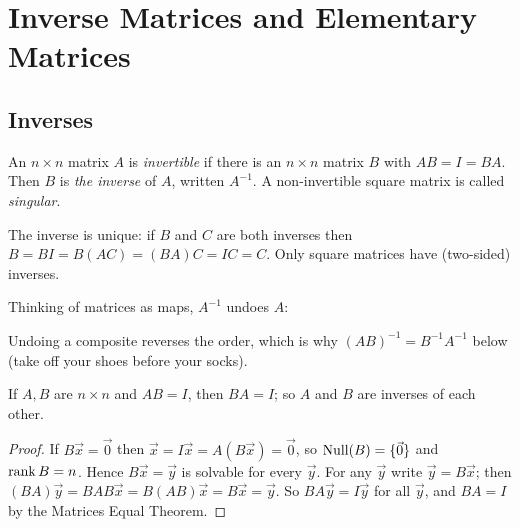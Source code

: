 \chapter{Inverse Matrices and Elementary Matrices}

\section{Inverses}

\begin{definition}
An $n\times n$ matrix $A$ is \emph{invertible} if there is an $n\times n$ matrix $B$ with
$AB=I=BA$. Then $B$ is \emph{the inverse} of $A$, written $A^{-1}$. A non-invertible square matrix is
called \emph{singular}.
\end{definition}

The inverse is unique: if $B$ and $C$ are both inverses then $B=BI=B(AC)=(BA)C=IC=C$.
Only square matrices have (two-sided) inverses.

Thinking of matrices as maps, $A^{-1}$ undoes $A$:
\begin{center}
\end{center}
Undoing a composite reverses the order, which is why $(AB)^{-1} = B^{-1}A^{-1}$ below
(take off your shoes before your socks).

\begin{theorem}
If $A,B$ are $n\times n$ and $AB=I$, then $BA=I$; so $A$ and $B$ are inverses of each other.
\end{theorem}
\begin{proof}
If $B\vec x=\vec0$ then $\vec x=I\vec x=A(B\vec x)=\vec 0$, so $\operatorname{Null}(B)=\{\vec0\}$ and
$\operatorname{rank} B=n$. Hence $B\vec x=\vec y$ is solvable for every $\vec y$. For any $\vec y$ write
$\vec y=B\vec x$; then $(BA)\vec y=BAB\vec x=B(AB)\vec x=B\vec x=\vec y$. So $BA\vec y=I\vec y$ for all
$\vec y$, and $BA=I$ by the Matrices Equal Theorem.
\end{proof}

